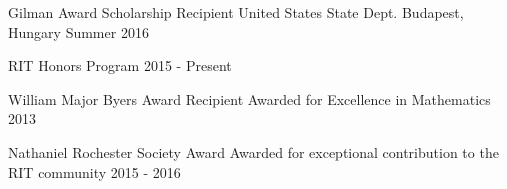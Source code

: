 


\begin{cvhonors}


\cvhonor
{Gilman Award Scholarship Recipient} %
{United States State Dept.} %
{Budapest, Hungary}
{Summer 2016} %


\cvhonor
{RIT Honors Program} %
{} %
{} %
{2015 - Present} %


\cvhonor
{William Major Byers Award Recipient} %
{Awarded for Excellence in Mathematics} %
{} %
{2013} %


\cvhonor
{Nathaniel Rochester Society Award} %
{Awarded for exceptional contribution to the RIT community} %
{} %
{2015 - 2016} %


\end{cvhonors}

